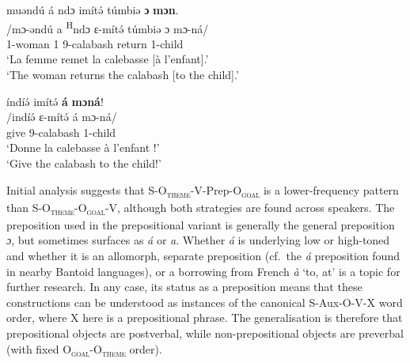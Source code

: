 \documentclass[output=paper,colorlinks,citecolor=brown
]{langscibook}
\begin{document}
\ex
\begin{xlist}
\label{ditransalt1a}
\glll
{\db}muəndú á ndɔ imítə́ túmbiə \textbf{ɔ} \textbf{mɔn}. \\
/mɔ-əndú a \textsuperscript{H}ndɔ ɛ-mítə́ túmbiə ɔ mɔ-ná/ \\
{\db}1-woman 1\SM{} \PRS{} 9-calabash return \PREP{} 1-child \\
\glt
`La femme remet la calebasse [à l'enfant]\textsubscript{\FOC{}}.' \\ `The woman returns the calabash [to the child]\textsubscript{\FOC{}}.' \jambox*{[JO 1586] }
\end{xlist}

\ex
\label{ditransalt2}
\glll
{\db}índíə́ imítə́ \textbf{á} \textbf{mɔná}! \\
/indíə́ ɛ-mítə́ á mɔ-ná/ \\
{\db}give 9-calabash \PREP{} 1-child \\
\glt
`Donne la calebasse à l'enfant !' \\ `Give the calabash to the child!' \jambox*{[JO 1595] }

\z
\z

Initial analysis suggests that S-O\textsubscript{\textsc{theme}}-V-Prep-O\textsubscript{\textsc{goal}} is a lower-frequency pattern than S-O\textsubscript{\textsc{theme}}-O\textsubscript{\textsc{goal}}-V, although both strategies are found across speakers. The preposition used in the prepositional variant is generally the general preposition \textit{ɔ}, but sometimes surfaces as \textit{á} or \textit{a}. Whether \textit{á} is underlying low or high-toned and whether it is an allomorph, separate preposition (cf.\ the \textit{á} preposition found in nearby Bantoid languages), or a borrowing from French \textit{à} `to, at' is a topic for further research. In any case, its status as a preposition means that these constructions can be understood as instances of the canonical S-Aux-O-V-X word order, where X here is a prepositional phrase. The generalisation is therefore that prepositional objects are postverbal, while non-prepositional objects are preverbal (with fixed O\textsubscript{\textsc{goal}}-O\textsubscript{\textsc{theme}} order).
\end{document}
